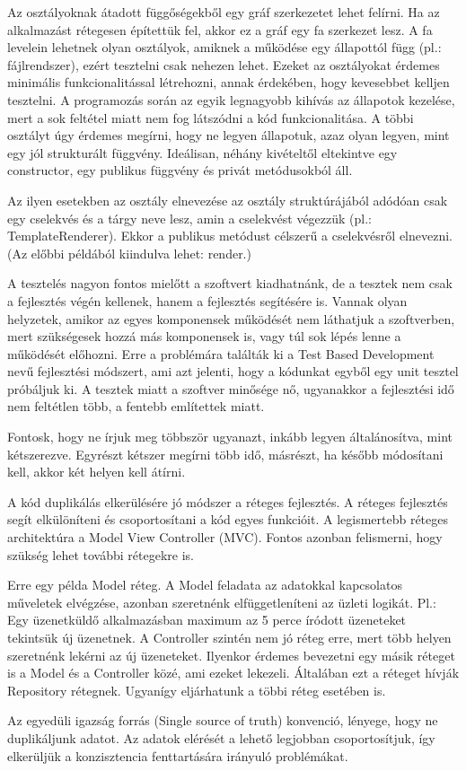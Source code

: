 \documentclass[a4paper,12pt,oneside]{report}
\begin{document}
\begin{justify}
	Az osztályoknak átadott függőségekből egy gráf szerkezetet lehet felírni. Ha az alkalmazást rétegesen építettük fel, akkor ez a gráf egy fa szerkezet lesz. A fa levelein lehetnek olyan osztályok, amiknek a működése egy állapottól függ (pl.: fájlrendszer), ezért tesztelni csak nehezen lehet. Ezeket az osztályokat érdemes minimális funkcionalitással létrehozni, annak érdekében, hogy kevesebbet kelljen tesztelni. A programozás során az egyik legnagyobb kihívás az állapotok kezelése, mert a sok feltétel miatt nem fog látszódni a kód funkcionalitása. A többi osztályt úgy érdemes megírni, hogy ne legyen állapotuk, azaz olyan legyen, mint egy jól strukturált függvény. Ideálisan, néhány kivételtől eltekintve egy constructor, egy publikus függvény és privát metódusokból áll. 

	Az ilyen esetekben az osztály elnevezése az osztály struktúrájából adódóan csak egy cselekvés és a tárgy neve lesz, amin a cselekvést végezzük (pl.: TemplateRenderer). Ekkor a publikus metódust célszerű a cselekvésről elnevezni. (Az előbbi példából kiindulva lehet: render.) 

	A tesztelés nagyon fontos mielőtt a szoftvert kiadhatnánk, de a tesztek nem csak a fejlesztés végén kellenek, hanem a fejlesztés segítésére is. Vannak olyan helyzetek, amikor az egyes komponensek működését nem láthatjuk a szoftverben, mert szükségesek hozzá más komponensek is, vagy túl sok lépés lenne a működését előhozni. Erre a problémára találták ki a Test Based Development nevű fejlesztési módszert, ami azt jelenti, hogy a kódunkat egyből egy unit tesztel próbáljuk ki. A tesztek miatt a szoftver minősége nő, ugyanakkor a fejlesztési idő nem feltétlen több, a fentebb említettek miatt.

	Fontosk, hogy ne írjuk meg többször ugyanazt, inkább legyen általánosítva, mint kétszerezve. Egyrészt kétszer megírni több idő, másrészt, ha később módosítani kell, akkor két helyen kell átírni. 

    A kód duplikálás elkerülésére jó módszer a réteges fejlesztés. A réteges fejlesztés segít elkülöníteni és csoportosítani a kód egyes funkcióit. A legismertebb réteges architektúra a Model View Controller (MVC). Fontos azonban felismerni, hogy szükség lehet további rétegekre is. 
    
    Erre egy példa Model réteg. A Model feladata az adatokkal kapcsolatos műveletek elvégzése, azonban szeretnénk elfüggetleníteni az üzleti logikát. Pl.: Egy üzenetküldő alkalmazásban maximum az 5 perce íródott üzeneteket tekintsük új üzenetnek. A Controller szintén nem jó réteg erre, mert több helyen szeretnénk lekérni az új üzeneteket. Ilyenkor érdemes bevezetni egy másik réteget is a Model és a Controller közé, ami ezeket lekezeli. Általában ezt a réteget hívják Repository rétegnek. Ugyanígy eljárhatunk a többi réteg esetében is.

	Az egyedüli igazság forrás (Single source of truth) konvenció, lényege, hogy ne duplikáljunk adatot. Az adatok elérését a lehető legjobban csoportosítjuk, így elkerüljük a konzisztencia fenttartására irányuló problémákat.



\end{justify}
\newpage
\end{document}
